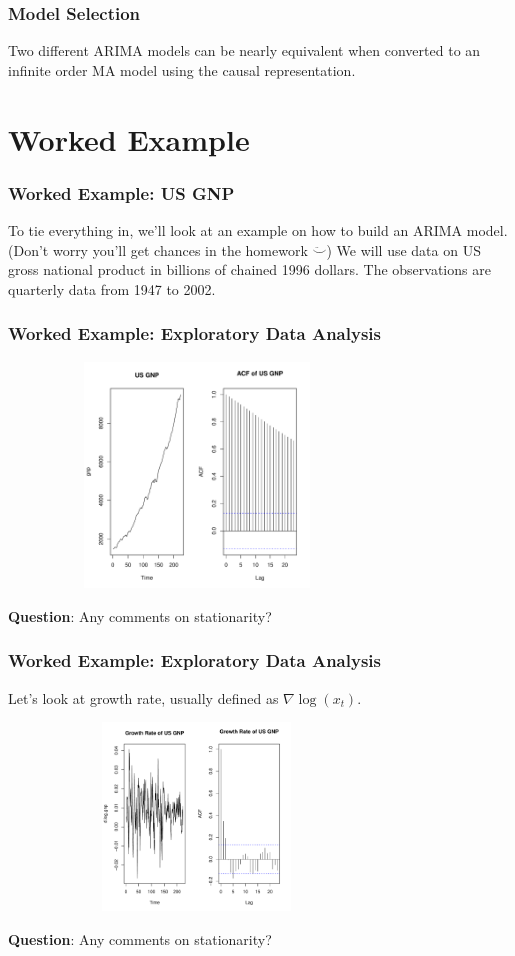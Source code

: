 \documentclass[%
xcolor=pdftex]{beamer}
\begin{document}
\begin{frame}
\frametitle{Model Selection}

Two different ARIMA models can be nearly equivalent when converted to an infinite order MA model using the causal representation.

\end{frame}

\section{Worked Example}
\frame{\tableofcontents[currentsection]}

\begin{frame}
\frametitle{Worked Example: US GNP}

To tie everything in, we'll look at an example on how to build an ARIMA model. (Don't worry you'll get chances in the homework $\ddot\smile$) We will use data on US gross national product in billions of chained 1996 dollars. The observations are quarterly data from 1947 to 2002.

\end{frame}

\begin{frame}
\frametitle{Worked Example: Exploratory Data Analysis}

\includegraphics[width=100mm, height=60mm]{ts.pdf}

\textbf{Question}: Any comments on stationarity?

\end{frame}

\begin{frame}
\frametitle{Worked Example: Exploratory Data Analysis}

Let's look at growth rate, usually defined as $\nabla \log(x_t)$.

\includegraphics[width=100mm, height=50mm]{growth.pdf}

\textbf{Question}: Any comments on stationarity?

\end{frame}
\end{document}
